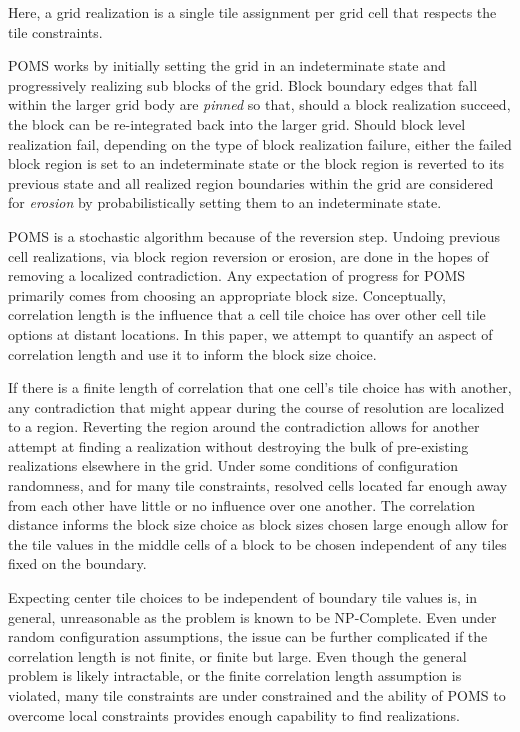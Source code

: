 Here, a grid realization is a single tile assignment per grid cell that respects the
tile constraints.

POMS works by initially setting the grid in an indeterminate state and progressively realizing
sub blocks of the grid.
Block boundary edges that fall within the larger grid body are \textit{pinned} so that, should a
block realization succeed, the block can be re-integrated back into the larger grid.
Should block level realization fail, depending on the type of block realization failure,
either the failed block region is set to an indeterminate state
or the block region is reverted to its previous state and all realized region boundaries within the grid
are considered for \textit{erosion} by probabilistically
setting them to an indeterminate state.

POMS is a stochastic algorithm because of the reversion step.
Undoing previous cell realizations, via
block region reversion or erosion, are done in the hopes of
removing a localized contradiction.
Any expectation of progress for POMS primarily comes from choosing an
appropriate block size.
Conceptually, correlation length is the influence that a cell tile choice
has over other cell tile options at distant locations.
In this paper, we attempt to quantify an aspect of correlation length and use it
to inform the block size choice.

If there is a finite length of correlation that one cell's tile choice has with another,
any contradiction that might appear during the course of resolution are localized to a region.
Reverting the region around the contradiction allows for another attempt at finding a
realization without destroying
the bulk of pre-existing realizations elsewhere in the grid.
Under some conditions of configuration randomness, and for many tile constraints,
resolved cells located far enough away from each other have little or no influence over one another.
The correlation distance informs the block size choice as block sizes chosen large enough allow
for the tile values in the middle cells of a block to be chosen independent of any tiles fixed on the boundary.

Expecting center tile choices to be independent of boundary tile values is, in general, unreasonable as
the problem is known to be NP-Complete.
Even under random configuration assumptions, the issue can be further complicated if the correlation length is not
finite, or finite but large.
Even though the general problem is likely intractable, or the finite correlation length assumption is
violated, many tile constraints are under constrained and the ability of POMS to overcome local constraints
provides enough capability to find realizations.

